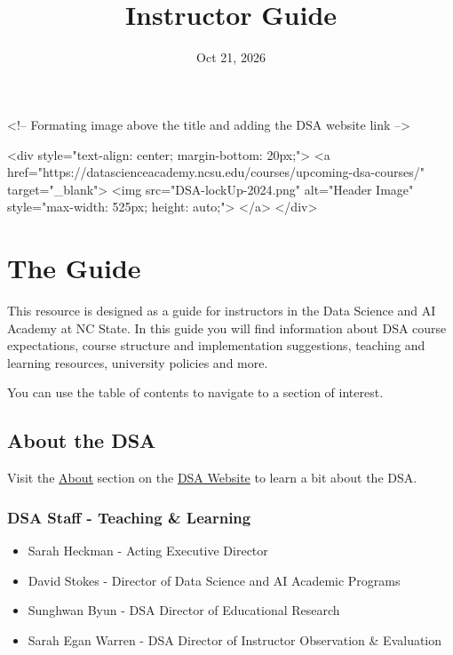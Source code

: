 \documentclass[
  letterpaper,
  DIV=11,
  numbers=noendperiod]{scrreprt}
\title{\\
Instructor Guide\\}
\author{}
\date{Oct 21, 2026}
\renewcommand*\contentsname{Table of contents}
\newcommand\contentsname{Table of contents}
\begin{document}
\maketitle

<!-- Formating image above the title and adding the DSA website link -->

<div style="text-align: center; margin-bottom: 20px;">
   <a href="https://datascienceacademy.ncsu.edu/courses/upcoming-dsa-courses/" target="_blank">
       <img src="DSA-lockUp-2024.png" alt="Header Image" style="max-width: 525px; height: auto;">
   </a>
</div>

\renewcommand*\contentsname{On this page}
{
\hypersetup{linkcolor=}
\setcounter{tocdepth}{2}
\tableofcontents
}


\chapter{The Guide}\label{the-guide}

This resource is designed as a guide for instructors in the Data Science
and AI Academy at NC State. In this guide you will find information
about DSA course expectations, course structure and implementation
suggestions, teaching and learning resources, university policies and
more.

You can use the table of contents to navigate to a section of interest.

\section{About the DSA}\label{about-the-dsa}

Visit the \href{https://datascienceacademy.ncsu.edu/about/}{About}
section on the \href{https://datascienceacademy.ncsu.edu/}{DSA Website}
to learn a bit about the DSA.

\subsection{DSA Staff - Teaching \&
Learning}\label{dsa-staff---teaching-learning}

\begin{itemize}
\item
  Sarah Heckman - Acting Executive Director
\item
  David Stokes - Director of Data Science and AI Academic Programs
\item
  Sunghwan Byun - DSA Director of Educational Research
\item
  Sarah Egan Warren - DSA Director of Instructor Observation \&
  Evaluation
\end{itemize}
\end{document}

